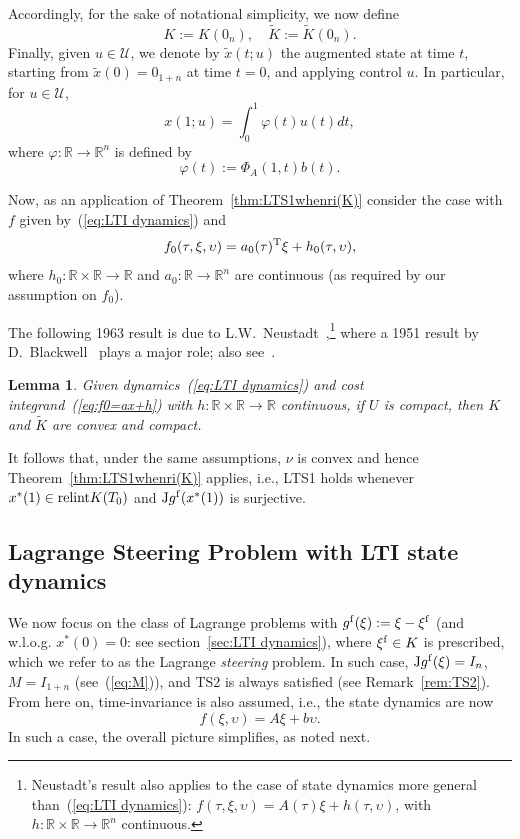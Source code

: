 \documentclass[letterpaper,10pt,conference]{ieeeconf}
\def\R{{\mathbb{R}}}
\newtheorem{lemma}{Lemma} %
\begin{document}
Accordingly, for the sake of notational simplicity, we now define
\[
K:=K(0_n),
\quad\tilde K:=\tilde K(0_n).\]
Finally, given $u\in\mathcal U$, we denote by $\tilde x(t;u)$
the augmented state at time $t$, starting from $\tilde x(0)=0_{1+n}$ at
time $t=0$, and applying control $u$.  In particular, for $u\in\mathcal U$,
\begin{equation}
\label{eq:x(1;u)}
x(1;u) = \int_0^1 \varphi(t) u(t) dt,
\end{equation}
where $\varphi:\R\to\R^n$ is defined by
\[
\varphi(t):=\Phi_A(1,t)b(t).
\]

Now, as an application of Theorem~\ref{thm:LTS1whenri(K)}
consider the case with $f$ given by~(\ref{eq:LTI dynamics}) and
\begin{equation}
\label{eq:f0=ax+h}
f_0(\tau,\xi,\upsilon)=a_0(\tau)^{\rm T}\xi+h_0(\tau,\upsilon),
\end{equation}
where $h_0:\R\times\R\to\R$ and $a_0:\R\to\R^n$ are continuous
(as required by our assumption on $f_0$).

\noindent
The following 1963 result is due to
L.W.~Neustadt~\cite[Theorem 1]{Neustadt1963},\footnote{Neustadt's
result also applies to the case of state dynamics more general 
than~(\ref{eq:LTI dynamics}):
$f(\tau,\xi,\upsilon)=A(\tau)\xi + h(\tau,\upsilon)$,
with $h:\R\times\R\to\R^n$ continuous.}
where a 1951 result by D.~Blackwell~\cite{Blackwell1951} plays a major role;
also see~\cite[Theorem 1]{Pecsvaradi1971}.
\begin{lemma}
\label{lem:Neustadt}
Given dynamics~(\ref{eq:LTI dynamics}) and cost integrand~(\ref{eq:f0=ax+h})
with $h:\R\times \R\to\R$ continuous,
if $U$ is compact, then $K$ and $\tilde K$ are convex and compact.
\end{lemma}

\noindent
It follows that, under the same assumptions, $\nu$ is convex
and hence Theorem~\ref{thm:LTS1whenri(K)} applies, i.e., LTS1 holds
whenever $x^*(1)\in{\rm relint} K(T_0)$ and ${\rm J}g^{\rm f}(x^*(1))$
is surjective.  

\subsection{Lagrange Steering Problem with LTI state dynamics}
\label{sec:LTIstate}

We now focus on the class of Lagrange problems 
with $g^{\rm f}(\xi):=\xi-\xi^{\rm f}$ 
(and w.l.o.g. $x^*(0)=0$: see section~\ref{sec:LTI dynamics}), 
where $\xi^{\rm f}\in K$ is prescribed, 
which we refer to as the Lagrange {\em steering} problem.
In such case, ${\rm J}g^{\rm f}(\xi)=I_n$, $M=I_{1+n}$
(see~(\ref{eq:M})), and TS2 is always satisfied (see Remark~\ref{rem:TS2}).
From here on, time-invariance is also assumed, i.e., the
state dynamics are now
\begin{equation}
\label{Ax+Bu}
f(\xi,\upsilon)=A\xi + b\upsilon.
\end{equation}
In such a case, the overall picture simplifies, as noted next.
\end{document}

